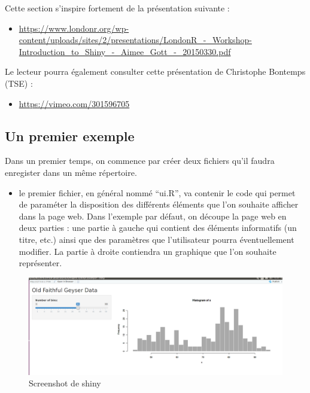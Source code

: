 \documentclass[
]{book}
\providecommand{\tightlist}{%
  \setlength{\itemsep}{0pt}\setlength{\parskip}{0pt}}
\theoremstyle{definition}
\theoremstyle{definition}
\theoremstyle{definition}
\theoremstyle{definition}
\theoremstyle{remark}
\begin{document}
Cette section s'inspire fortement de la présentation suivante :

\begin{itemize}
\tightlist
\item
  \url{https://www.londonr.org/wp-content/uploads/sites/2/presentations/LondonR_-_Workshop-Introduction_to_Shiny_-_Aimee_Gott_-_20150330.pdf}
\end{itemize}

Le lecteur pourra également consulter cette présentation de Christophe Bontemps (TSE) :

\begin{itemize}
\tightlist
\item
  \url{https://vimeo.com/301596705}
\end{itemize}

\hypertarget{un-premier-exemple}{%
\subsection{Un premier exemple}\label{un-premier-exemple}}

Dans un premier temps, on commence par créer deux fichiers qu'il faudra enregister dans un même répertoire.

\begin{itemize}
\tightlist
\item
  le premier fichier, en général nommé ``ui.R'', va contenir le code qui permet de paraméter la disposition des différents éléments que l'on souhaite afficher dans la page web. Dans l'exemple par défaut, on découpe la page web en deux parties : une partie à gauche qui contient des éléments informatifs (un titre, etc.) ainsi que des paramètres que l'utilisateur pourra éventuellement modifier. La partie à droite contiendra un graphique que l'on souhaite représenter.
\end{itemize}

\begin{figure}
\centering
\includegraphics{Figures/screen_shiny.png}
\caption{Screenshot de shiny}
\end{figure}
\end{document}
